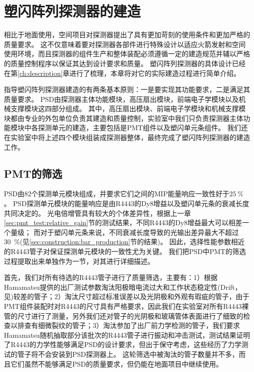 \chapter{塑闪阵列探测器的建造}
\label{ch:construction}
相比于地面使用，空间项目对探测器提出了具有更加苛刻的使用条件和更加严格的质量要求。
这不仅意味着要对探测器各部件进行特殊设计以适应火箭发射和空间使用环境，而且探测器的组件生产和整体装配必须遵循一定的建造规范并辅以严格的质量控制程序以保证其达到设计要求和质量。
塑闪阵列探测器的具体设计已经在第\ref{ch:description}章进行了梳理，本章将对它的实际建造过程进行简单介绍。

指导塑闪阵列探测器建造的有两条基本原则：一是要实现其功能要求，二是满足其质量要求。
PSD由探测器主体功能模块，高压扇出模块，前端电子学模块以及机械支撑模块这四部分组成。
其中，高压扇出模块、前端电子学模块和机械支撑模块都由专业的外包单位负责其建造和质量控制，实验室中我们只负责探测器主体功能模块中各探测单元的建造，主要包括是PMT组件以及塑闪单元条组件。
我们还在实验室中将上述四个模块组装成探测器整体，最终完成了塑闪阵列探测器的建造工作。

\section{PMT的筛选}
\label{sec:construction:pmt_selection}
PSD由82个探测单元模块组成，并要求它们之间的MIP能量响应一致性好于$\SI{25}{\percent}$。
PSD探测单元模块的能量响应是由R4443的Dy8增益以及塑闪单元条的衰减长度共同决定的。
光电倍增管具有较大的个体差异性，根据上一章\ref{sec:pmt_test:relative_gain}节的测试结果，不同R4443的Dy8增益最大可以相差一个量级；
而对于塑闪单元条来说，不同衰减长度导致的光输出差异最大不超过\SI{30}{\percent}(见\ref{sec:construction:bar_production}节的结果)。
因此，选择性能参数相近的R4443管子对保证探测单元模块的一致性尤为关键。
我们把PSD中PMT的筛选过程提取出来单独作为一节，对其进行详细描述。

首先，我们对所有待选的R4443管子进行了质量筛选，主要有：1）根据Hamamatsu提供的出厂测试参数淘汰阳极暗电流过大和工作状态稳定性(Drift，见\cite{hamamatsu})较差的管子；2）淘汰尺寸超过标准误差以及光阴极和外观有瑕疵的管子，由于PMT组件装配时对R4443的尺寸具有严格要求，因此我们在实验室对所有R4443裸管的尺寸进行了测量，另外我们还对管子的光阴极和玻璃管体表面进行了细致的检查以排查有细微裂纹的管子；3）淘汰参加了出厂前力学检测的管子，我们要求Hamamatsu随机抽取部分该批次的R4443管子进行振动和冲击测试，测试结果证明了R4443的力学性能够满足PSD的设计要求，但出于保守考虑，这些经历了力学测试的管子将不会安装到PSD探测器上。
这轮筛选中被淘汰的管子数量并不多，而且它们虽然不能够满足PSD的质量要求，但仍能在地面项目中继续使用。

